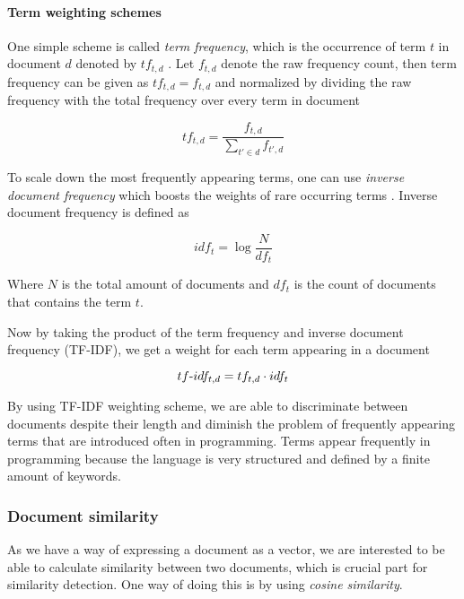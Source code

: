 \paragraph{Term weighting schemes}

One simple scheme is called \emph{term frequency}, which is the occurrence of term $t$ in document $d$ denoted by $tf_{t, d}$ \cite{Manning:2008:IIR:1394399}. Let $f_{t, d}$ denote the raw frequency count, then term frequency can be given as $tf_{t, d} = f_{t, d}$ and normalized by dividing the raw frequency with the total frequency over every term in document

\begin{equation} \label{eq-tf}
    tf_{t, d} = \dfrac{f_{t, d}}{\sum \limits_{t' \in d} f_{t', d}}
\end{equation}

To scale down the most frequently appearing terms, one can use \emph{inverse document frequency} which boosts the weights of rare occurring terms \cite{Manning:2008:IIR:1394399}. Inverse document frequency is defined as

\begin{equation}
    idf_t = \log \dfrac{N}{df_t}
\end{equation}

\noindent
Where $N$ is the total amount of documents and $df_{t}$ is the count of documents that contains the term $t$.

Now by taking the product of the term frequency and inverse document frequency (TF-IDF), we get a weight for each term appearing in a document

\begin{equation}
    tf{\text -}idf_{t, d} = tf_{t, d} \cdot idf_{t}
\end{equation}

By using TF-IDF weighting scheme, we are able to discriminate between documents despite their length and diminish the problem of frequently appearing terms that are introduced often in programming. Terms appear frequently in programming because the language is very structured and defined by a finite amount of keywords. 

\subsubsection{Document similarity} \label{chap-bg-sim}

As we have a way of expressing a document as a vector, we are interested to be able to calculate similarity between two documents, which is crucial part for similarity detection. One way of doing this is by using \emph{cosine similarity}.

